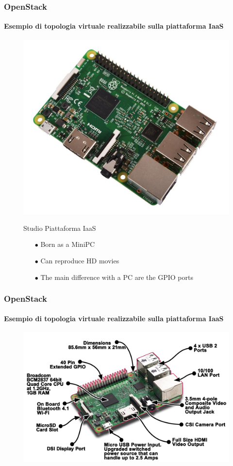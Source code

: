 \documentclass{beamer}
\begin{document}
\begin{frame}
\frametitle{\textbf{OpenStack}}
\framesubtitle{\textbf{Esempio di topologia virtuale realizzabile sulla piattaforma IaaS}}
\begin{figure}
\centering
\includegraphics[scale=0.15]{imgs/rasp3b.jpg}
\begin{block}{Studio Piattaforma IaaS}
\begin{itemize}
\item[$\bullet$] Born as a MiniPC
\item[$\bullet$] Can reproduce HD movies
\item[$\bullet$] The main difference with a PC are the GPIO ports
\end{itemize}
\end{block}
\end{figure}
\end{frame}


\begin{frame}
\frametitle{\textbf{OpenStack}}
\framesubtitle{\textbf{Esempio di topologia virtuale realizzabile sulla piattaforma IaaS}}
\begin{figure}
\centering
\includegraphics[scale=0.70]{imgs/rasp3btec.png}
\end{figure}
\end{frame}
\end{document}
